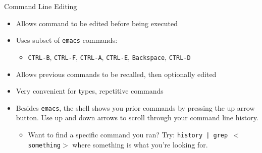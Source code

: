 \documentclass[graphics]{beamer}
\begin{document}
\begin{frame}{Command Line Editing}
    \begin{itemize}
        \item Allows command to be edited before being executed
        \item Uses subset of \texttt{emacs} commands:
        \begin{itemize}
            \item \texttt{CTRL-B}, \texttt{CTRL-F}, \texttt{CTRL-A}, \texttt{CTRL-E}, \texttt{Backspace}, \texttt{CTRL-D}
        \end{itemize}
        \item Allows previous commands to be recalled, then optionally edited
        \item Very convenient for types, repetitive commands
        \item Besides \texttt{emacs}, the shell shows you prior commands by pressing the up arrow button. Use up and down arrows to scroll through your command line history.
        \begin{itemize}
            \item Want to find a specific command you ran? Try: \texttt{history | grep $<$something$>$} where something is what you're looking for.
        \end{itemize}
    \end{itemize}
\end{frame}
\end{document}
